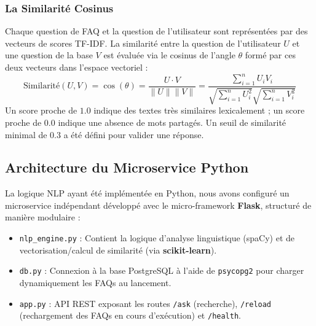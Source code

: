 \documentclass[11pt,a4paper]{article}
\begin{document}
\subsubsection{La Similarité Cosinus}
Chaque question de FAQ et la question de l'utilisateur sont représentées par des vecteurs de scores TF-IDF. La similarité entre la question de l'utilisateur $U$ et une question de la base $V$ est évaluée via le cosinus de l'angle $\theta$ formé par ces deux vecteurs dans l'espace vectoriel :
\[ \text{Similarité}(U, V) = \cos(\theta) = \frac{U \cdot V}{\|U\| \|V\|} = \frac{\sum_{i=1}^{n} U_i V_i}{\sqrt{\sum_{i=1}^{n} U_i^2} \sqrt{\sum_{i=1}^{n} V_i^2}} \]
Un score proche de $1.0$ indique des textes très similaires lexicalement ; un score proche de $0.0$ indique une absence de mots partagés. Un seuil de similarité minimal de $0.3$ a été défini pour valider une réponse.

\subsection{Architecture du Microservice Python}
La logique NLP ayant été implémentée en Python, nous avons configuré un microservice indépendant développé avec le micro-framework \textbf{Flask}, structuré de manière modulaire :

\begin{itemize}
    \item \texttt{nlp\_engine.py} : Contient la logique d'analyse linguistique (spaCy) et de vectorisation/calcul de similarité (via \textbf{scikit-learn}).
    \item \texttt{db.py} : Connexion à la base PostgreSQL à l'aide de \texttt{psycopg2} pour charger dynamiquement les FAQs au lancement.
    \item \texttt{app.py} : API REST exposant les routes \texttt{/ask} (recherche), \texttt{/reload} (rechargement des FAQs en cours d'exécution) et \texttt{/health}.
\end{itemize}
\end{document}
